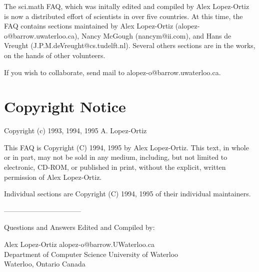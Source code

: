 
The sci.math FAQ, which was initally edited and compiled by Alex
Lopez-Ortiz is now a distributed effort of scientists in over five
countries. At this time, the FAQ contains sections maintained by Alex
Lopez-Ortiz (alopez-o@barrow.uwaterloo.ca), Nancy McGough
(nancym@ii.com), and Hans de Vreught
(J.P.M.deVreught@cs.tudelft.nl). Several others sections are in the
works, on the hands of other volunteers.

If you wish to collaborate, send mail to alopez-o@barrow.uwaterloo.ca.



\section{Copyright Notice}

Copyright (c) 1993, 1994, 1995   A. Lopez-Ortiz

  This FAQ is Copyright (C) 1994, 1995 by Alex Lopez-Ortiz. This text,
  in whole or in part, may not be sold in any medium, including,
  but not limited to electronic, CD-ROM, or published in print,
  without the explicit, written permission of Alex Lopez-Ortiz.

  Individual sections are Copyright (C) 1994, 1995 of their individual 
  maintainers.


---------------------------------

\noindent Questions and Answers Edited and Compiled by:

\medskip

\noindent Alex Lopez-Ortiz          alopez-o@barrow.UWaterloo.ca\\
Department of Computer Science     University of Waterloo\\
Waterloo, Ontario                             Canada\\


